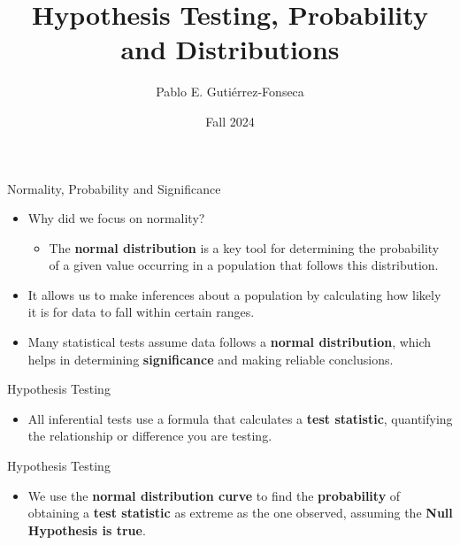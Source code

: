 \documentclass[
  ignorenonframetext,
]{beamer}
\title{Hypothesis Testing, Probability and Distributions}
\author{Pablo E. Gutiérrez-Fonseca}
\date{Fall 2024}
\providecommand{\tightlist}{%
  \setlength{\itemsep}{0pt}\setlength{\parskip}{0pt}}
\begin{document}
\frame{\titlepage}

\begin{frame}{Normality, Probability and Significance}
\label{normality-probability-and-significance}
\begin{itemize}
\tightlist
\item
  Why did we focus on normality?

  \begin{itemize}
  \tightlist
  \item
    The \textbf{normal distribution} is a key tool for determining the
    probability of a given value occurring in a population that follows
    this distribution.
  \end{itemize}
\end{itemize}

\begin{itemize}
\tightlist
\item
  It allows us to make inferences about a population by calculating how
  likely it is for data to fall within certain ranges.
\end{itemize}

\begin{itemize}
\tightlist
\item
  Many statistical tests assume data follows a \textbf{normal
  distribution}, which helps in determining \textbf{significance} and
  making reliable conclusions.
\end{itemize}
\end{frame}

\begin{frame}{Hypothesis Testing}
\label{hypothesis-testing}
\begin{itemize}
\tightlist
\item
  All inferential tests use a formula that calculates a \textbf{test
  statistic}, quantifying the relationship or difference you are
  testing.
\end{itemize}
\end{frame}

\begin{frame}{Hypothesis Testing}
\label{hypothesis-testing-1}
\begin{itemize}
\tightlist
\item
  We use the \textbf{normal distribution curve} to find the
  \textbf{probability} of obtaining a \textbf{test statistic} as extreme
  as the one observed, assuming the \textbf{Null Hypothesis is true}.
\end{itemize}
\end{frame}
\end{document}
